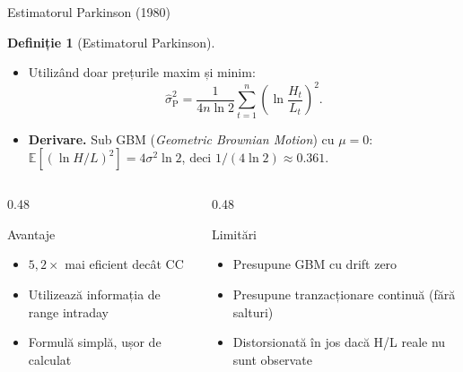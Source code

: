 \documentclass[9pt, aspectratio=169, t]{beamer}
\theoremstyle{definition}
\newtheorem{defn}{Definiție}
\newcommand{\E}{\mathbb{E}}
\begin{document}
\begin{frame}[shrink=3]{Estimatorul Parkinson (1980)}
\begin{defn}[Estimatorul Parkinson]
\begin{itemize}\setlength{\itemsep}{1pt}
    \item Utilizând doar prețurile maxim și minim:
    \[
    \hat{\sigma}_{\text{P}}^2 = \frac{1}{4n\ln 2}\sum_{t=1}^{n}\left(\ln\frac{H_t}{L_t}\right)^2.
    \]
\end{itemize}
\end{defn}
\begin{itemize}
    \item \textbf{Derivare.} Sub GBM (\textit{Geometric Brownian Motion}) cu $\mu=0$: $\E[(\ln H/L)^2] = 4\sigma^2\ln 2$, deci $1/(4\ln 2) \approx 0.361$.
\end{itemize}
\vspace{0.05cm}
\begin{columns}[T]
\begin{column}{0.48\textwidth}
\begin{block}{Avantaje}
\begin{itemize}\setlength{\itemsep}{0pt}
    \item $5{,}2\times$ mai eficient decât CC
    \item Utilizează informația de range intraday
    \item Formulă simplă, ușor de calculat
\end{itemize}
\end{block}
\end{column}
\begin{column}{0.48\textwidth}
\begin{block}{Limitări}
\begin{itemize}\setlength{\itemsep}{0pt}
    \item Presupune GBM cu drift zero
    \item Presupune tranzacționare continuă (fără salturi)
    \item Distorsionată în jos dacă H/L reale nu sunt observate
\end{itemize}
\end{block}
\end{column}
\end{columns}
\end{frame}
\end{document}
